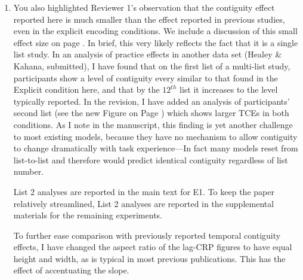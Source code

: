 \documentclass[12pt]{article}
\begin{document}
\begin{enumerate}
\item
	You also highlighted Reviewer 1's observation that the contiguity effect reported here is much smaller than the effect reported in previous studies, even in the explicit encoding conditions. We include a discussion of this small effect size on page \pageref{TODO-5}. In brief, this very likely reflects the fact that it is a single list study. In an analysis of practice effects in another data set (Healey \& Kahana, submitted), I have found that on the first list of a multi-list study, participants show a level of contiguity every similar to that found in the Explicit condition here, and that by the $12^{th}$ list it increases to the level typically reported. In the revision, I have added an analysis of participants' second list (see the new Figure on Page \pageref{TODO-6}) which shows larger TCEs in both conditions.  As I note in the manuscript, this finding is yet another challenge to most existing models, because they have no mechanism to allow contiguity to change dramatically with task experience---In fact many models reset from list-to-list and therefore would predict identical contiguity regardless of list number.

	List 2 analyses are reported in the main text for E1. To keep the paper relatively streamlined, List 2 analyses are reported in the supplemental materials for the remaining experiments.

	To further ease comparison with previously reported temporal contiguity effects, I have changed the aspect ratio of the lag-CRP figures to have equal height and width, as is typical in most previous publications. This has the effect of accentuating the slope. 



\end{enumerate}
\end{document}
